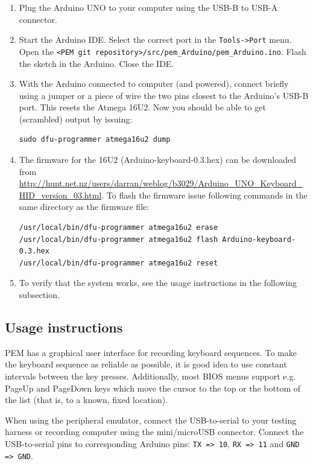\documentclass[a4paper,11pt]{article}
\newcommand{\cmd}[1]{\texttt{#1}}
\begin{document}
\begin{enumerate}
\item Plug the Arduino UNO to your computer using the USB-B to USB-A connector.

\item Start the Arduino IDE. Select the correct port in the \cmd{Tools->Port} menu. Open the \cmd{<PEM git repository>/src/pem\_Arduino/pem\_Arduino.ino}. Flash the sketch in the Arduino. Close the IDE.

\item With the Arduino connected to computer (and powered), connect briefly using a jumper or a piece of wire the two pins closest to the Arduino's USB-B port. This resets the Atmega 16U2. Now you should be able to get (scrambled) output by issuing:
\begin{lstlisting}
sudo dfu-programmer atmega16u2 dump
\end{lstlisting}

\item The firmware for the 16U2 (Arduino-keyboard-0.3.hex) can be downloaded from \url{http://hunt.net.nz/users/darran/weblog/b3029/Arduino_UNO_Keyboard_HID_version_03.html}. To flash the firmware issue following commands in the same directory as the firmware file:
\begin{lstlisting}
/usr/local/bin/dfu-programmer atmega16u2 erase
/usr/local/bin/dfu-programmer atmega16u2 flash Arduino-keyboard-0.3.hex
/usr/local/bin/dfu-programmer atmega16u2 reset
\end{lstlisting}

\item To verify that the system works, see the usage instructions in the following subsection.
\end{enumerate}

\subsection{Usage instructions}
PEM has a graphical user interface for recording keyboard sequences. To make the keyboard sequence as reliable as possible, it is good idea to use constant intervals between the key presses. Additionally, most BIOS menus support e.g. PageUp and PageDown keys which move the cursor to the top or the bottom of the list (that is, to a known, fixed location).

When using the peripheral emulator, connect the USB-to-serial to your testing harness or recording computer using the mini/microUSB connector. Connect the USB-to-serial pins to corresponding Arduino pins: \cmd{TX => 10}, \cmd{RX => 11} and \cmd{GND => GND}.
\end{document}
